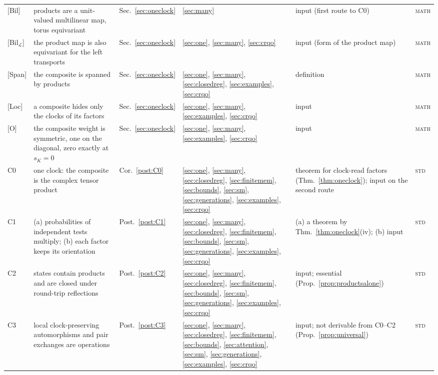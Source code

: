 \documentclass[aps,pra,onecolumn,superscriptaddress,nofootinbib,10pt]{revtex4-2}
\theoremstyle{definition}
\theoremstyle{remark}
\newcommand{\cL}{\mathcal{L}}
\begin{document}
\begin{table}[p]
\begin{tabular}{@{}p{}p{}p{}p{}p{}p{}@{}}
{[Bil]} & products are a unit-valued multilinear map, torus equivariant & Sec.~\ref{sec:oneclock} & \ref{sec:many} & input (first route to C0) & \textsc{math}\\
{[Bil$_\cL$]} & the product map is also equivariant for the left transports & Sec.~\ref{sec:oneclock} & \ref{sec:one}, \ref{sec:many}, \ref{sec:crqo} & input (form of the product map) & \textsc{math}\\
{[Span]} & the composite is spanned by products & Sec.~\ref{sec:oneclock} & \ref{sec:one}, \ref{sec:many}, \ref{sec:closedreg}, \ref{sec:examples}, \ref{sec:crqo} & definition & \textsc{math}\\
{[Loc]} & a composite hides only the clocks of its factors & Sec.~\ref{sec:oneclock} & \ref{sec:one}, \ref{sec:many}, \ref{sec:examples}, \ref{sec:crqo} & input & \textsc{math}\\
{[O]} & the composite weight is symmetric, one on the diagonal, zero exactly at $s_K=0$ & Sec.~\ref{sec:oneclock} & \ref{sec:one}, \ref{sec:many}, \ref{sec:examples}, \ref{sec:crqo} & input & \textsc{math}\\
{C0} & one clock: the composite is the complex tensor product & Cor.~\ref{post:C0} & \ref{sec:one}, \ref{sec:many}, \ref{sec:closedreg}, \ref{sec:finitemem}, \ref{sec:bounds}, \ref{sec:sm}, \ref{sec:generations}, \ref{sec:examples}, \ref{sec:crqo} & theorem for clock-read factors (Thm.~\ref{thm:oneclock}); input on the second route & \textsc{std}\\
{C1} & (a) probabilities of independent tests multiply; (b) each factor keeps its orientation & Post.~\ref{post:C1} & \ref{sec:one}, \ref{sec:many}, \ref{sec:closedreg}, \ref{sec:finitemem}, \ref{sec:bounds}, \ref{sec:sm}, \ref{sec:generations}, \ref{sec:examples}, \ref{sec:crqo} & (a) a theorem by Thm.~\ref{thm:oneclock}(iv); (b) input & \textsc{std}\\
{C2} & states contain products and are closed under round-trip reflections & Post.~\ref{post:C2} & \ref{sec:one}, \ref{sec:many}, \ref{sec:closedreg}, \ref{sec:finitemem}, \ref{sec:bounds}, \ref{sec:sm}, \ref{sec:generations}, \ref{sec:examples}, \ref{sec:crqo} & input; essential (Prop.~\ref{prop:productsalone}) & \textsc{std}\\
{C3} & local clock-preserving automorphisms and pair exchanges are operations & Post.~\ref{post:C3} & \ref{sec:one}, \ref{sec:many}, \ref{sec:closedreg}, \ref{sec:finitemem}, \ref{sec:bounds}, \ref{sec:attention}, \ref{sec:sm}, \ref{sec:generations}, \ref{sec:examples}, \ref{sec:crqo} & input; not derivable from C0--C2 (Prop.~\ref{prop:universal}) & \textsc{std}\\

\end{tabular}
\end{table}
\end{document}
